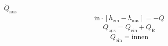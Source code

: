 \( \dot{Q}_{\text{aus}} \)  
\[ \text{in} \cdot [h_{\text{ein}} - h_{\text{aus}}] = -\dot{Q} \]  
\[ \dot{Q}_{\text{aus}} = \dot{Q}_{\text{ein}} + \dot{Q}_{\text{R}} \]  
\[ \dot{Q}_{\text{ein}} = \text{innen} \]